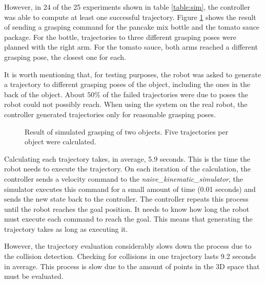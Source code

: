 However, in 24 of the 25 experiments shown in table \ref{table:sim}, the controller was able to compute at least one successful trajectory. Figure \ref{fig:traj_sim} shows the result of sending a grasping command for the pancake mix bottle and the tomato sauce package. For the bottle, trajectories to three different grasping poses were planned with the right arm. For the tomato sauce, both arms reached a different grasping pose, the closest one for each.

It is worth mentioning that, for testing purposes, the robot was asked to generate a trajectory to different grasping poses of the object, including the ones in the back of the object. About $50\%$ of the failed trajectories were due to poses the robot could not possibly reach. When using the system on the real robot, the controller generated trajectories only for reasonable grasping poses.

\begin{figure}[H]
	\centering
	\begin{subfigure}[]
		{\texttt{[image: sim\_result.png]}}
	\end{subfigure}
	\begin{subfigure}[]
		{\texttt{[image: sim\_result2.png]}}
	\end{subfigure}
	\vspace{-10pt}
	\caption[Simulated Trajectories]{Result of simulated grasping of two objects. Five trajectories per object were calculated.}
	\vspace{-15pt}
	\label{fig:traj_sim}
\end{figure}

Calculating each trajectory takes, in average, 5.9 seconds. This is the time the robot needs to execute the trajectory. On each iteration of the calculation, the controller sends a velocity command to the \textit{naive\_kinematic\_simulator}, the simulator executes this command for a small amount of time (0.01 seconds) and sends the new state back to the controller. The controller repeats this process until the robot reaches the goal position. It needs to know how long the robot must execute each command to reach the goal. This means that generating the trajectory takes as long as executing it.

However, the trajectory evaluation considerably slows down the process due to the collision detection. Checking for collisions in one trajectory lasts 9.2 seconds in average. This process is slow due to the amount of points in the 3D space that must be evaluated.

